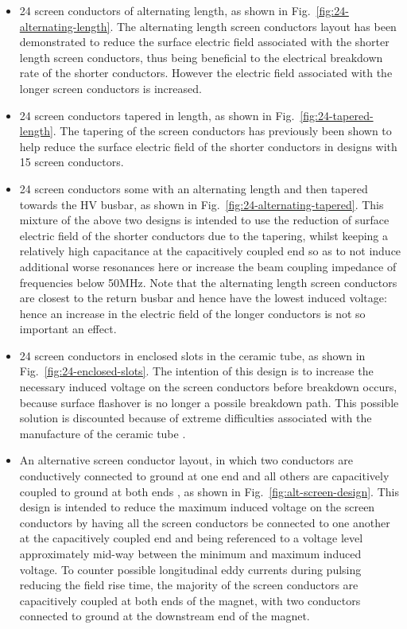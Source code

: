 \begin{itemize}
\item{24 screen conductors of alternating length, as shown in Fig.~\ref{fig:24-alternating-length}. The alternating length screen conductors layout has been demonstrated to reduce the surface electric field associated with the shorter length screen conductors, thus being beneficial to the electrical breakdown rate of the shorter conductors. However the electric field associated with the longer screen conductors is increased.}
\item{24 screen conductors tapered in length, as shown in Fig.~\ref{fig:24-tapered-length}. The tapering of the screen conductors has previously been shown to help reduce the surface electric field of the shorter conductors in designs with 15 screen conductors.}
\item{24 screen conductors some with an alternating length and then tapered towards the HV busbar, as shown in Fig.~\ref{fig:24-alternating-tapered}. This mixture of the above two designs is intended to use the reduction of surface electric field of the shorter conductors due to the tapering, whilst keeping a relatively high capacitance at the capacitively coupled end so as to not induce additional worse resonances here or increase the beam coupling impedance of frequencies below 50MHz. Note that the alternating length screen conductors are closest to the return busbar and hence have the lowest induced voltage: hence an increase in the electric field of the longer conductors is not so important an effect.}
\item{24 screen conductors in enclosed slots in the ceramic tube, as shown in Fig.~\ref{fig:24-enclosed-slots}. The intention of this design is to increase the necessary induced voltage on the screen conductors before breakdown occurs, because surface flashover is no longer a possile breakdown path. This possible solution is discounted because of extreme difficulties associated with the manufacture of the ceramic tube \cite{Barnes:8thStratMeet}.}
\item{An alternative screen conductor layout, in which two conductors are conductively connected to ground at one end and all others are capacitively coupled to ground at both ends \cite{Barnes:mkiAlt}, as shown in Fig.~\ref{fig:alt-screen-design}. This design is intended to reduce the maximum induced voltage on the screen conductors by having all the screen conductors be connected to one another at the capacitively coupled end and being referenced to a voltage level approximately mid-way between the minimum and maximum induced voltage. To counter possible longitudinal eddy currents during pulsing reducing the field rise time, the majority of the screen conductors are capacitively coupled at both ends of the magnet, with two conductors connected to ground at the downstream end of the magnet.}

\end{itemize}
